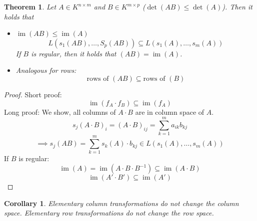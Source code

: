 \documentclass[a4paper,landscape,twocolumn]{article}
\newtheorem{theorem}{Theorem}[section]
\newtheorem{cor}{Corollary}[section]
\DeclareMathOperator\image{im} %
\begin{document}
\begin{theorem}
  \label{lemma-6.38}
  Let $A \in K^{n\times m}$ and $B \in K^{m\times p}$ ($\det(AB) \leq \det(A)$).
  Then it holds that
  \begin{itemize}
    \item $\image(AB) \leq \image(A)$
      \[ L(s_1(AB), \ldots, S_p(AB)) \subseteq L(s_1(A), \ldots, s_m(A)) \]
      If $B$ is regular, then it holds that $(AB) = \image(A)$.
    \item Analogous for rows:
      \[ \text{rows of } (AB) \subseteq \text{rows of } (B) \]
  \end{itemize}
\end{theorem}
\begin{proof}
  Short proof:
  \[ \image(f_A \cdot f_B) \subseteq \image(f_A) \]
  Long proof: We show, all columns of $A\cdot B$ are in column space of $A$.
  \[ s_j(A \cdot B)_i = (A\cdot B)_{ij} = \sum_{k=1}^m a_{ik} b_{kj} \]
  \[ \implies s_j(AB) = \sum_{k=1}^m s_k(A) \cdot b_{kj} \in L(s_1(A), \ldots, s_m(A)) \]
  If $B$ is regular:
  \[ \image(A) = \image(A \cdot B \cdot B^{-1}) \subseteq \image(A \cdot B) \]
  \[ \image(A' \cdot B') \subseteq \image(A') \]
\end{proof}
\begin{cor}
  \label{korollar-6.35}
  Elementary column transformations do not change the column space.
  Elementary row transformations do not change the row space.
\end{cor}
\end{document}
